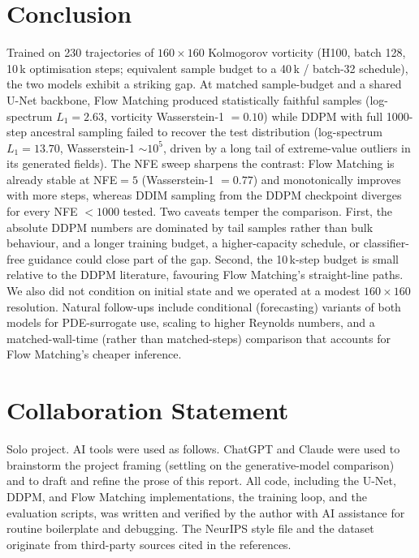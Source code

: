 \documentclass{article}
\begin{document}
\section{Conclusion}

Trained on 230 trajectories of $160\times160$ Kolmogorov vorticity (H100,
batch 128, 10\,k optimisation steps; equivalent sample budget to a 40\,k /
batch-32 schedule), the two models exhibit a striking gap. At matched
sample-budget and a shared U-Net backbone, Flow Matching produced
statistically faithful samples (log-spectrum $L_1=2.63$, vorticity
Wasserstein-1 $=0.10$) while DDPM with full 1000-step ancestral sampling
failed to recover the test distribution (log-spectrum $L_1=13.70$,
Wasserstein-1 $\sim 10^{5}$, driven by a long tail of extreme-value outliers
in its generated fields). The NFE sweep sharpens the contrast: Flow Matching
is already stable at NFE$=5$ (Wasserstein-1 $=0.77$) and monotonically
improves with more steps, whereas DDIM sampling from the DDPM checkpoint
diverges for every NFE $<1000$ tested. Two caveats temper the comparison.
First, the absolute DDPM numbers are dominated by tail samples rather than
bulk behaviour, and a longer training budget, a higher-capacity schedule, or
classifier-free guidance could close part of the gap. Second, the 10\,k-step
budget is small relative to the DDPM literature, favouring Flow Matching's
straight-line paths. We also did not condition on initial state and we
operated at a modest $160\times160$ resolution. Natural follow-ups include
conditional (forecasting) variants of both models for PDE-surrogate use,
scaling to higher Reynolds numbers, and a matched-wall-time (rather than
matched-steps) comparison that accounts for Flow Matching's cheaper
inference.

\clearpage
\section*{Collaboration Statement}

Solo project. AI tools were used as follows. ChatGPT and Claude were used to
brainstorm the project framing (settling on the generative-model comparison)
and to draft and refine the prose of this report. All code, including the
U-Net, DDPM, and Flow Matching implementations, the training loop, and the
evaluation scripts, was written and verified by the author with AI assistance
for routine boilerplate and debugging. The NeurIPS style file and the dataset
originate from third-party sources cited in the references.



\end{document}
